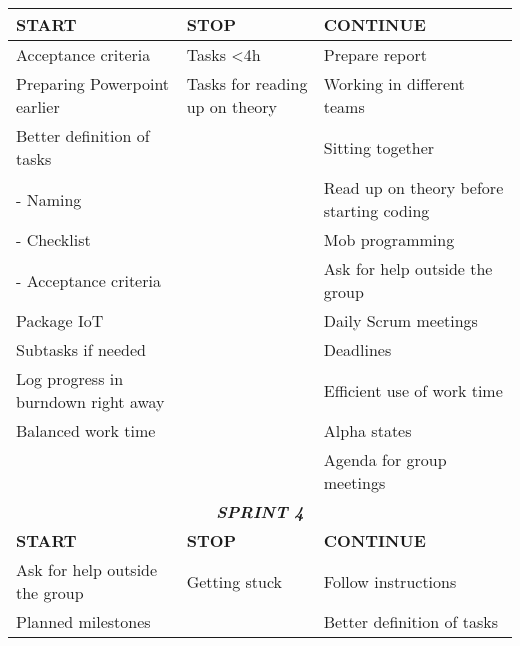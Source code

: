 \begin{table}[htbp]
{\begin{tabular}{lll}
\textbf{START}                      & \textbf{STOP}                      & \textbf{CONTINUE}                                \\ \hline
Acceptance criteria                 & Tasks \textless 4h                 & Prepare report                                   \\
Preparing Powerpoint earlier        & Tasks for reading up on theory     & Working in different teams                       \\
Better definition of tasks          &                                    & Sitting together                                 \\
- Naming                            &                                    & Read up on theory before starting coding         \\
- Checklist                         &                                    & Mob programming                                  \\
- Acceptance criteria               &                                    & Ask for help outside the group                   \\
Package IoT                         &                                    & Daily Scrum meetings                             \\
Subtasks if needed                  &                                    & Deadlines                                        \\
Log progress in burndown right away &                                    & Efficient use of work time                       \\
Balanced work time                  &                                    & Alpha states                                     \\
                                    &                                    & Agenda for group meetings                        \\ \hline
\multicolumn{3}{c}{\rowcolor{grey} \textit{\textbf{SPRINT 4}}}                                                                              \\ \hline
\textbf{START}                      & \textbf{STOP}                      & \textbf{CONTINUE}                                \\ \hline
Ask for help outside the group      & Getting stuck                      & Follow instructions                              \\
Planned milestones                  &                                    & Better definition of tasks                       \\

\end{tabular}}
\end{table}
